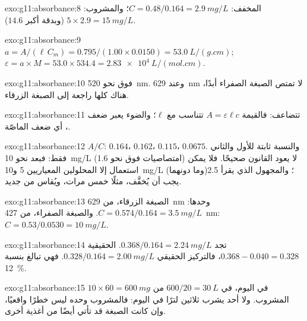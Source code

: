 \begin{solution}{exo:g11:absorbance:8}
المخفف: $C = 0.48 / 0.164 = \qty{2.9}{mg/L}$؛ والمشروب:
$5 \times 2.9 = \qty{15}{mg/L}$ (وبدقة أكبر $14.6$).
\end{solution}

\begin{solution}{exo:g11:absorbance:9}
$a = A / (\ell\, C_m) = 0.795 / (1.00 \times 0.0150) = \qty{53.0}{L/(g.cm)}$;
$\varepsilon = a \times M = 53.0 \times 534.4 = \qty{2.83e4}{L/(mol.cm)}$.
\end{solution}

\begin{solution}{exo:g11:absorbance:10}
فوق نحو \qty{520}{nm}. وعند \qty{629}{nm} لا تمتص الصبغة الصفراء أبدًا،
 هناك كلها راجعة إلى الصبغة الزرقاء.
\end{solution}

\begin{solution}{exo:g11:absorbance:11}
تتضاعف: فالقيمة $A = \varepsilon \ell c$ تتناسب مع $\ell$؛ والضوء يعبر ضعف
، أي ضعف  الماصّة.
\end{solution}

\begin{solution}{exo:g11:absorbance:12}
$A/C$: $0.164$، $0.162$، $0.115$، $0.0675$. والنسبة ثابتة للأول والثاني فقط:
فبعد نحو \qty{10}{mg/L} (امتصاصيات فوق نحو 1.6) لا يعود القانون صحيحًا.
فلا يمكن استعمال إلا المحلولين المعياريين 5 و\qty{10}{mg/L} (وما دونهما)؛
والمجهول الذي يقرأ 2.5 يجب أن يُخفَّف، مثلًا خمس مرات، ويُقاس من
جديد.
\end{solution}

\begin{solution}{exo:g11:absorbance:13}
الصبغة الزرقاء، من \qty{629}{nm} وحدها: $C = 0.574 / 0.164 = \qty{3.5}{mg/L}$.
والصبغة الصفراء، من \qty{427}{nm}: $C = 0.53 / 0.0530 = \qty{10}{mg/L}$.
\end{solution}

\begin{solution}{exo:g11:absorbance:14}
تجد $0.368 / 0.164 = \qty{2.24}{mg/L}$.  الحقيقية
$0.368 - 0.040 = 0.328$، فالتركيز الحقيقي
$0.328 / 0.164 = \qty{2.00}{mg/L}$. فهي تبالغ بنسبة \qty{12}{\percent}.
\end{solution}

\begin{solution}{exo:g11:absorbance:15}
$10 \times 60 = \qty{600}{mg}$ في اليوم، في $600 / 20 = \qty{30}{L}$ من
المشروب. ولا أحد يشرب ثلاثين لترًا في اليوم: فالمشروب وحده ليس خطرًا واقعيًا،
وإن كانت الصبغة قد تأتي أيضًا من أغذية أخرى.
\end{solution}


